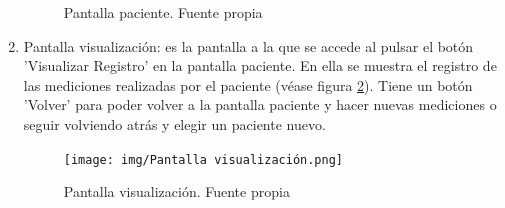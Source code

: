\begin{enumerate}
\begin{figure}
        \caption{Pantalla paciente. Fuente propia}
        \label{fig:Pantalla paciente}
    \end{figure}
    \item Pantalla visualización: es la pantalla a la que se accede al pulsar el botón 'Visualizar Registro' en la pantalla paciente. En ella se muestra el registro de las mediciones realizadas por el paciente (véase figura \ref{fig:Pantalla visualización}). Tiene un botón 'Volver' para poder volver a la pantalla paciente y hacer nuevas mediciones o seguir volviendo atrás y elegir un paciente nuevo.
    \begin{figure}
        \centering
        \texttt{[image: img/Pantalla visualización.png]}
        \caption{Pantalla visualización. Fuente propia}
        \label{fig:Pantalla visualización}
    \end{figure}
\end{enumerate}